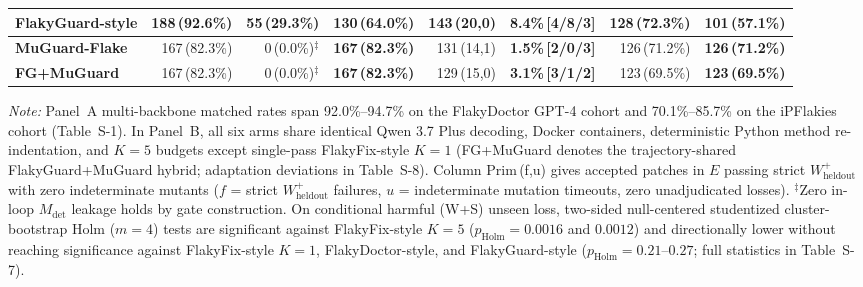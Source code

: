 \begin{table}[t]
\begin{tabular}{@{}lrrrrrrr@{}}
FlakyGuard-style & 188\,(92.6\%) & \textbf{55\,(29.3\%)} & 130\,(64.0\%) & 143\,(20,0) & 8.4\%\,[4/8/3] & 128\,(72.3\%) & 101\,(57.1\%) \\
\midrule
\textbf{MuGuard-Flake} & 167\,(82.3\%) & 0\,(0.0\%)$^{\ddagger}$ & \textbf{167\,(82.3\%)} & 131\,(14,1) & \textbf{1.5\%\,[2/0/3]} & 126\,(71.2\%) & \textbf{126\,(71.2\%)} \\
\textbf{FG+MuGuard} & 167\,(82.3\%) & 0\,(0.0\%)$^{\ddagger}$ & \textbf{167\,(82.3\%)} & 129\,(15,0) & \textbf{3.1\%\,[3/1/2]} & 123\,(69.5\%) & \textbf{123\,(69.5\%)} \\
\bottomrule
\end{tabular}
\par\smallskip\parbox{0.97\textwidth}{\scriptsize\textit{Note:} Panel~A multi-backbone matched rates span 92.0\%--94.7\% on the FlakyDoctor GPT-4 cohort and 70.1\%--85.7\% on the iPFlakies cohort (Table~S-1). In Panel~B, all six arms share identical Qwen 3.7 Plus decoding, Docker containers, deterministic Python method re-indentation, and $K=5$ budgets except single-pass FlakyFix-style $K=1$ (FG+MuGuard denotes the trajectory-shared FlakyGuard+MuGuard hybrid; adaptation deviations in Table~S-8). Column Prim\,(f,u) gives accepted patches in $E$ passing strict $W^+_{\text{heldout}}$ with zero indeterminate mutants ($f$ = strict $W^+_{\text{heldout}}$ failures, $u$ = indeterminate mutation timeouts, zero unadjudicated losses). $^{\ddagger}$Zero in-loop $M_{\text{det}}$ leakage holds by gate construction. On conditional harmful (W+S) unseen loss, two-sided null-centered studentized cluster-bootstrap Holm ($m=4$) tests are significant against FlakyFix-style $K=5$ ($p_{\text{Holm}}=0.0016$ and $0.0012$) and directionally lower without reaching significance against FlakyFix-style $K=1$, FlakyDoctor-style, and FlakyGuard-style ($p_{\text{Holm}}=0.21\text{--}0.27$; full statistics in Table~S-7).}
\end{table}
